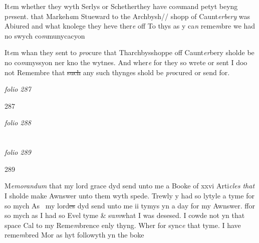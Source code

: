 \documentclass[12pt, a4paper]{book}
\begin{document}
 	
				\marginpar[\vspace{0.5cm}{\textcolor{Gray}{22}}]{}
			
		\ifthenelse{\isodd{\thepage}}
		{\reversemarginpar}
		{\normalmarginpar}
		 It\textit{e}m whether they wyth Serlys or Schetherthey have co\textit{m}mand
petyt beyng p\textit{re}sent. that Markeh\textit{a}m Stueward to the Archbysh//
shopp of Caunt\textit{erbery} was Abiured and what knolege they heve
ther\textit{e} off
To thys as y ca\textit{n} reme\textit{m}bre we had no swych co\textit{m}munycacyon


 	
				\marginpar[\vspace{0.5cm}{\textcolor{Gray}{24}}]{}
			
		\ifthenelse{\isodd{\thepage}}
		{\reversemarginpar}
		{\normalmarginpar}
		It\textit{e}m whan they sent to \textit{pro}cure that Tharchbysshoppe off
Caunt\textit{er}bery sholde be no co\textit{m}myssyon ner kno the wytnes. And
wher\textit{e} for they so wrete or sent
I doo not Remembre that \sout{such }any such thynges shold be 
\textit{pro}cured or send for.

\dotfill
						\newpage
{}

\textit{folio 287}


         	\begin{flushright}{\color{Mahogany}287}\end{flushright}


\dotfill
						\newpage
{}

\textit{folio 288}


         \vspace*{4cm}
         
\dotfill
						  \section*{}  \subsection*{}

\textit{folio 289}



            		\begin{flushright}{\color{Mahogany}289}\end{flushright}


		\ifthenelse{\isodd{\thepage}}
		{\reversemarginpar}
		{\normalmarginpar}
		M\textit{emorandum} that my lord grace dyd send unto me a Booke of xxvi Arti\textit{cles that} I sholde make
Awnswer unto them wyth spede. Trewly y had so lytyle a tyme for so mych As 
my lord\sout{es}
               dyd
			 send unto me ii tymys yn a day for my Awnswer. ffor so mych as I had
so Evel tyme \& su\textit{m}what I was desesed. I cowde not yn that space Cal to my Reme\textit{m}brence
enly thyng. Wher for sync\textit{e} that tyme. I have reme\textit{m}bred Mor as hyt followyth yn the boke
\end{document}
